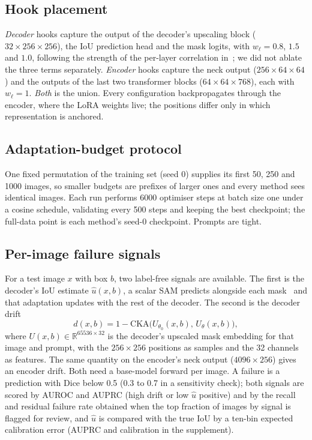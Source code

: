 \subsection{Hook placement}
\label{sec:hooks}

\emph{Decoder} hooks capture the output of the decoder's upscaling block ($32 \times 256 \times 256$), the IoU prediction head and the mask logits, with $w_\ell = 0.8$, $1.5$ and $1.0$, following the strength of the per-layer correlation in~\cite{prior2026safer}; we did not ablate the three terms separately. \emph{Encoder} hooks capture the neck output ($256 \times 64 \times 64$) and the outputs of the last two transformer blocks ($64 \times 64 \times 768$), each with $w_\ell = 1$. \emph{Both} is the union. Every configuration backpropagates through the encoder, where the LoRA weights live; the positions differ only in which representation is anchored.

\subsection{Adaptation-budget protocol}
\label{sec:budget}

One fixed permutation of the training set (seed 0) supplies its first 50, 250 and 1000 images, so smaller budgets are prefixes of larger ones and every method sees identical images. Each run performs 6000 optimiser steps at batch size one under a cosine schedule, validating every 500 steps and keeping the best checkpoint; the full-data point is each method's seed-0 checkpoint. Prompts are tight.

\subsection{Per-image failure signals}
\label{sec:detector}

For a test image $x$ with box $b$, two label-free signals are available. The first is the decoder's IoU estimate $\hat{u}(x, b)$, a scalar SAM predicts alongside each mask~\cite{kirillov2023sam} and that adaptation updates with the rest of the decoder. The second is the decoder drift
\begin{equation}
  d(x, b) = 1 - \mathrm{CKA}\bigl(U_{\theta_0}(x, b),\, U_{\theta}(x, b)\bigr),
  \label{eq:drift}
\end{equation}
where $U(x,b) \in \mathbb{R}^{65536 \times 32}$ is the decoder's upscaled mask embedding for that image and prompt, with the $256 \times 256$ positions as samples and the 32 channels as features. The same quantity on the encoder's neck output ($4096 \times 256$) gives an encoder drift. Both need a base-model forward per image. A failure is a prediction with Dice below 0.5 (0.3 to 0.7 in a sensitivity check); both signals are scored by AUROC and AUPRC (high drift or low $\hat{u}$ positive) and by the recall and residual failure rate obtained when the top fraction of images by signal is flagged for review, and $\hat{u}$ is compared with the true IoU by a ten-bin expected calibration error (AUPRC and calibration in the supplement).
